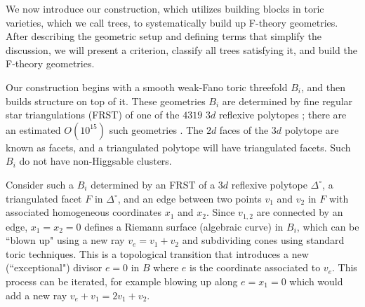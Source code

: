 \documentclass[aps,prl,twocolumn, superscriptaddress,groupedaddress,nofootinbib]{revtex4-1}
\begin{document}
\vspace{.2cm}

We now introduce our construction, which utilizes building blocks in toric
varieties, which we call trees, to systematically build up F-theory geometries.
After describing the geometric setup and defining terms that simplify the
discussion, we will present a criterion, classify all trees satisfying it, and
build the F-theory geometries.


Our construction begins with a smooth weak-Fano toric threefold $B_i$, and
then builds structure on top of it. These geometries $B_i$ are  determined by
fine regular star triangulations (FRST) of one of the $4319$  $3d$ reflexive
polytopes \cite{Kreuzer:1998vb}; there are an estimated
 $O(10^{15})$ such geometries \cite{Halverson:2016tve}. The $2d$
faces of the $3d$ polytope are known as facets, and a triangulated polytope
will have triangulated facets.  Such $B_i$ do not have non-Higgsable clusters.

Consider such a $B_i$ determined by an FRST of a $3d$ reflexive polytope
$\Delta^\circ$, a triangulated facet $F$ in $\Delta^\circ$, and an edge
between two points $v_1$ and $v_2$ in $F$ with
associated homogeneous coordinates $x_1$ and $x_2$. Since $v_{1,2}$ are connected
by an edge, $x_1=x_2=0$ defines a Riemann surface (algebraic curve)
in $B_i$, which can be ``blown up" using a new ray $v_e=v_1+v_2$ and subdividing
cones using standard toric techniques. This is a topological transition that introduces
a new (``exceptional") divisor $e=0$ in $B$ where $e$ is the coordinate associated to $v_e$.
This
process can be iterated, for example blowing up along $e=x_1=0$ which would
add a new ray $v_e+v_1=2v_1+v_2$.
\end{document}
